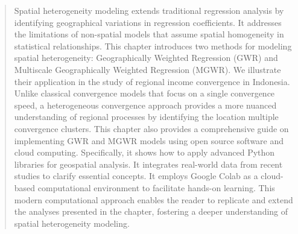 \documentclass[smallextended, natbib]{svjour3}       %
\begin{document}
\begin{abstract}
\begin{singlespace}

Spatial heterogeneity modeling extends traditional regression analysis by identifying geographical variations in regression coefficients. It addresses the limitations of non-spatial models that assume spatial homogeneity in statistical relationships. This chapter introduces two methods for modeling spatial heterogeneity: Geographically Weighted Regression (GWR) and Multiscale Geographically Weighted Regression (MGWR). We illustrate their application in the study of regional income convergence in Indonesia.  Unlike classical convergence models that focus on a single convergence speed, a heterogeneous convergence approach provides a more nuanced understanding of regional processes by identifying the location multiple convergence clusters. This chapter also provides a comprehensive guide on implementing GWR and MGWR models using open source software and cloud computing. Specifically, it shows how to apply advanced Python libraries for geospatial analysis. It integrates real-world data from recent studies to clarify essential concepts. It employs Google Colab as a cloud-based computational environment to facilitate hands-on learning. This modern computational approach enables the reader to replicate and extend the analyses presented in the chapter, fostering a deeper understanding of spatial heterogeneity modeling.



\end{singlespace}
\end{abstract}
\end{document}
